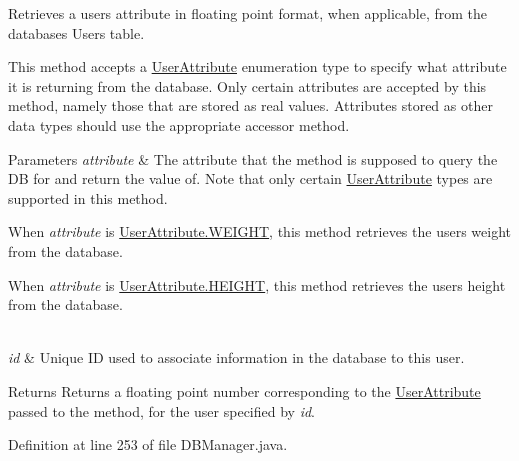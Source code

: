 Retrieves a user\textquotesingle{}s attribute in floating point format, when applicable, from the database\textquotesingle{}s Users table.

This method accepts a \mbox{\hyperlink{enumcom_1_1activitytracker_1_1_user_attribute}{User\+Attribute}} enumeration type to specify what attribute it is returning from the database. Only certain attributes are accepted by this method, namely those that are stored as real values. Attributes stored as other data types should use the appropriate accessor method.


\begin{DoxyParams}{Parameters}
{\em attribute} & The attribute that the method is supposed to query the DB for and return the value of. Note that only certain \mbox{\hyperlink{enumcom_1_1activitytracker_1_1_user_attribute}{User\+Attribute}} types are supported in this method.
\begin{DoxyItemize}
\item When {\itshape attribute} is \mbox{\hyperlink{enumcom_1_1activitytracker_1_1_user_attribute_a024206b0dc3261031ef586b3f0fd530c}{User\+Attribute.\+W\+E\+I\+G\+HT}}, this method retrieves the user\textquotesingle{}s weight from the database.
\item When {\itshape attribute} is \mbox{\hyperlink{enumcom_1_1activitytracker_1_1_user_attribute_a0a80ca5cce8eb4494c2128bd4291a5b7}{User\+Attribute.\+H\+E\+I\+G\+HT}}, this method retrieves the user\textquotesingle{}s height from the database. 
\end{DoxyItemize}\\
\hline
{\em id} & Unique ID used to associate information in the database to this user.\\
\hline
\end{DoxyParams}
\begin{DoxyReturn}{Returns}
Returns a floating point number corresponding to the \mbox{\hyperlink{enumcom_1_1activitytracker_1_1_user_attribute}{User\+Attribute}} passed to the method, for the user specified by {\itshape id}. 
\end{DoxyReturn}


Definition at line 253 of file D\+B\+Manager.\+java.


